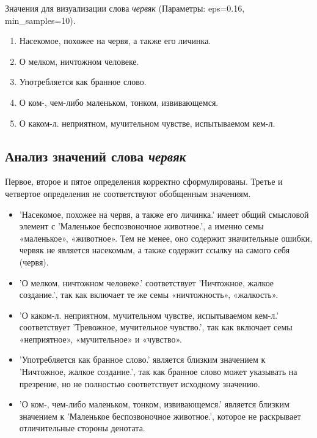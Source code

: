 Значения для визуализации слова \textit{червяк} (Параметры: eps=0.16, min\_samples=10).

\begin{enumerate}
    \item Насекомое, похожее на червя, а также его личинка.
    \item О мелком, ничтожном человеке.
    \item Употребляется как бранное слово.
    \item О ком-, чем-либо маленьком, тонком, извивающемся.
    \item О каком-л. неприятном, мучительном чувстве, испытываемом кем-л.
\end{enumerate}

\subsection*{Анализ значений слова \textit{червяк}}

Первое, второе и пятое определения корректно сформулированы.
Третье и четвертое определения не соответствуют обобщенным значениям.

\begin{itemize}
    \item ’Насекомое, похожее на червя, а также его личинка.’ имеет общий смысловой элемент с
’Маленькое беспозвоночное животное.’, а именно семы «маленькое», «животное».
Тем не менее, оно содержит значительные ошибки, червяк не является насекомым, а также содержит
ссылку на самого себя (червя).

    \item ’О мелком, ничтожном человеке.’ соответствует
’Ничтожное, жалкое создание.’, так как включает те же семы «ничтожность», «жалкость».

    \item ’О каком-л. неприятном, мучительном чувстве, испытываемом кем-л.’ соответствует
’Тревожное, мучительное чувство.’, так как включает семы «неприятное», «мучительное» и
«чувство».
\end{itemize}

\begin{itemize}
    \item ’Употребляется как бранное слово.’ является близким значением к
’Ничтожное, жалкое создание.’, так как бранное слово может указывать на презрение,
но не полностью соответствует исходному значению.

    \item ’О ком-, чем-либо маленьком, тонком, извивающемся.’ является близким значением к
’Маленькое беспозвоночное животное.’, которое не раскрывает отличительные стороны денотата.
\end{itemize}

